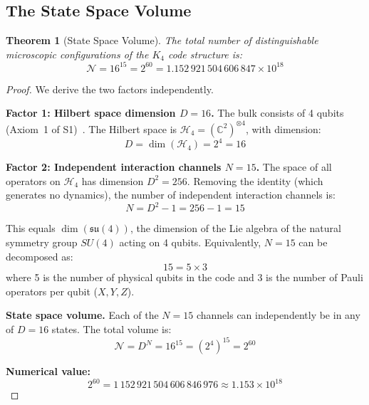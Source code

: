 \documentclass[11pt,a4paper]{article}
\newtheorem{theorem}{Theorem}[section]
\theoremstyle{definition}
\theoremstyle{remark}
\newcommand{\Hilbert}{\mathcal{H}}
\newcommand{\NN}{\mathcal{N}}
\begin{document}
\subsection{The State Space Volume}

\begin{theorem}[State Space Volume]
\label{thm:statespace}
The total number of distinguishable microscopic configurations of the $K_4$ code structure is:
\begin{equation}
\boxed{\NN = 16^{15} = 2^{60} = 1.152\,921\,504\,606\,847 \times 10^{18}}
\end{equation}
\end{theorem}

\begin{proof}
We derive the two factors independently.

\textbf{Factor 1: Hilbert space dimension $D = 16$.}
The bulk consists of 4 qubits (Axiom~1 of S1)~\cite{NielsenChuang2010}. The Hilbert space is $\Hilbert_4 = (\mathbb{C}^2)^{\otimes 4}$, with dimension:
\begin{equation}
D = \dim(\Hilbert_4) = 2^4 = 16
\end{equation}

\textbf{Factor 2: Independent interaction channels $N = 15$.}
The space of all operators on $\Hilbert_4$ has dimension $D^2 = 256$. Removing the identity (which generates no dynamics), the number of independent interaction channels is:
\begin{equation}
N = D^2 - 1 = 256 - 1 = 15
\end{equation}

This equals $\dim(\mathfrak{su}(4))$, the dimension of the Lie algebra of the natural symmetry group $SU(4)$ acting on 4 qubits. Equivalently, $N = 15$ can be decomposed as:
\begin{equation}
15 = 5 \times 3
\end{equation}
where 5 is the number of physical qubits in the code and 3 is the number of Pauli operators per qubit ($X, Y, Z$).

\textbf{State space volume.}
Each of the $N = 15$ channels can independently be in any of $D = 16$ states. The total volume is:
\begin{equation}
\NN = D^N = 16^{15} = (2^4)^{15} = 2^{60}
\end{equation}

\textbf{Numerical value:}
\begin{equation}
2^{60} = 1\,152\,921\,504\,606\,846\,976 \approx 1.153 \times 10^{18}
\end{equation}
\end{proof}
\end{document}
